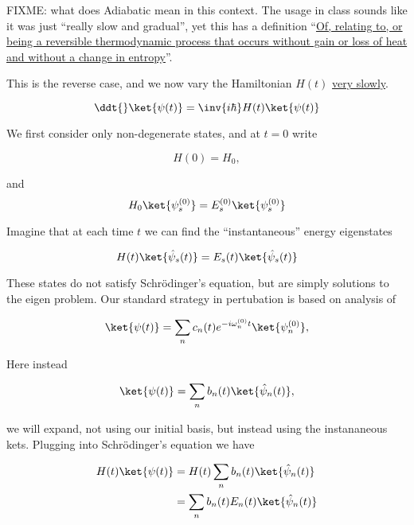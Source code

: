 FIXME: what does Adiabatic mean in this context.  The usage in class sounds like it was just ``really slow and gradual'', yet this has a definition ``\href{http://www.thefreedictionary.com/adiabatic}{Of, relating to, or being a reversible thermodynamic process that occurs without gain or loss of heat and without a change in entropy}''.

This is the reverse case, and we now vary the Hamiltonian $H(t)$ \underline{very slowly}.

\begin{equation}\label{eqn:qmTwoL8:150f}
\ddt{} \ket{\psi(t)} = \inv{i \hbar} H(t) \ket{\psi(t)}
\end{equation}

We first consider only non-degenerate states, and at $t = 0$ write

\begin{equation}\label{eqn:qmTwoL8:300}
H(0) = H_0,
\end{equation}

and
\begin{equation}\label{eqn:qmTwoL8:320}
H_0 \ket{\psi_s^{(0)}} = E_s^{(0)} \ket{\psi_s^{(0)}}
\end{equation}

Imagine that at each time $t$ we can find the ``instantaneous'' energy eigenstates

\begin{equation}\label{eqn:qmTwoL8:340}
H(t) \ket{\hat{\psi}_s(t)} = E_s(t) \ket{\hat{\psi}_s(t)} 
\end{equation}

These states do not satisfy Schr\"{o}dinger's equation, but are simply solutions to the eigen problem.  Our standard strategy in pertubation is based on analysis of

\begin{equation}\label{eqn:qmTwoL8:360}
\ket{\psi(t)} = \sum_n c_n(t) e^{- i \omega_n^{(0)} t} \ket{\psi_n^{(0)} },
\end{equation}

Here instead

\begin{equation}\label{eqn:qmTwoL8:380}
\ket{\psi(t)} = 
\sum_n b_n(t) \ket{\hat{\psi}_n(t)}
,
\end{equation}

we will expand, not using our initial basis, but instead using the instananeous kets.  Plugging into Schr\"{o}dinger's equation we have

\begin{align*}
H(t) \ket{\psi(t)} 
&= H(t) \sum_n b_n(t) \ket{\hat{\psi}_n(t)} \\
&= \sum_n b_n(t) E_n(t) \ket{\hat{\psi}_n(t)} 
\end{align*}

